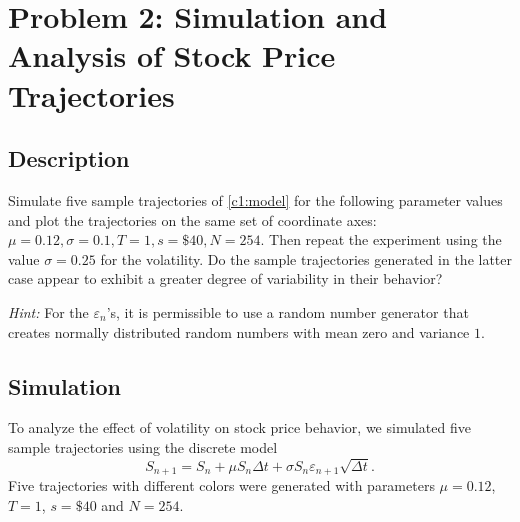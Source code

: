 \section{Problem 2: Simulation and Analysis of Stock Price Trajectories}
\subsection{Description}
Simulate five sample trajectories of \eqref{c1:model} for the following parameter values and plot the trajectories on the same set of coordinate axes: $\mu = 0.12, \sigma = 0.1, T = 1, s = \$40, N = 254$. Then repeat the experiment using the value $\sigma = 0.25$ for the volatility. Do the sample trajectories generated in the latter case appear to exhibit a greater degree of variability in their behavior?

\textit{Hint:} For the $\varepsilon_n$'s, it is permissible to use a random number generator that creates normally distributed random numbers with mean zero and variance $1$.

\subsection{Simulation}
To analyze the effect of volatility on stock price behavior, we simulated five sample trajectories using the discrete model
\begin{equation*}
	S_{n+1} = S_n + \mu S_n \Delta t + \sigma S_n \varepsilon_{n+1} \sqrt{\Delta t}.
\end{equation*}
Five trajectories with different colors were generated with parameters $\mu = 0.12$, $T = 1$, $s = \$40$ and $N = 254$.

